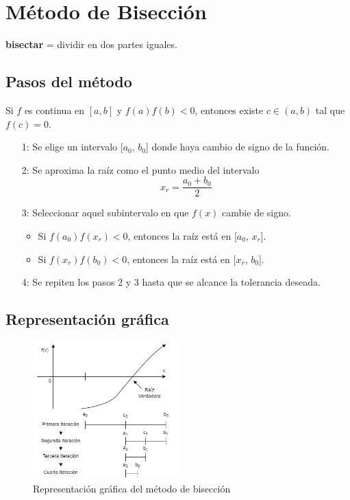 \documentclass{article}
\begin{document}
\pagestyle{fancy}
\fancyhf{}
\fancyhead[L]{\leftmark} %
\renewcommand{\headrulewidth}{0.4pt} %
\fancyfoot[R]{\thepage} %
\renewcommand{\footrulewidth}{0.4pt} %

\section*{Método de Bisección}
\begin{mdframed}[backgroundcolor=yellow!40,shadow=true,shadowsize=2pt,roundcorner=2pt]
\begin{center}    \textbf{bisectar} = dividir en dos partes iguales. \end{center}
\end{mdframed}
\subsection*{Pasos del método}
Si $f$ es continua en $[a,b]$ y $f(a)f(b)<0$, entonces existe $c\in(a,b)$ tal que $f(c)=0$.
\begin{itemize}
    \item[1:] Se elige un intervalo [$a_0$, $b_0$] donde haya cambio de signo de la función.
    \item[2:] Se aproxima la raíz como el punto medio del intervalo
    \begin{equation*}
        x_r = \frac{a_0 + b_0}{2}
    \end{equation*}
    \item[3:] Seleccionar aquel subintervalo en que $f(x)$ cambie de signo.
    \begin{itemize}
        \item Si $f(a_0)f(x_r)<0$, entonces la raíz está en [$a_0$, $x_r$].
        \item Si $f(x_r)f(b_0)<0$, entonces la raíz está en [$x_r$, $b_0$].
    \end{itemize}
    \item[4:] Se repiten los pasos 2 y 3 hasta que se alcance la tolerancia deseada.
\end{itemize}
\subsection*{Representación gráfica}
\begin{figure}[H]
    \centering
    \includegraphics[width=0.5\textwidth]{bisec.png}
    \caption{Representación gráfica del método de bisección}
\end{figure}
\end{document}
